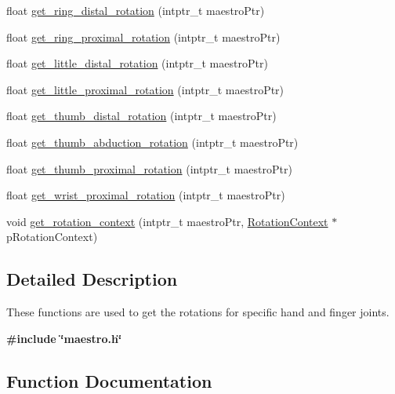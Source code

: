 \begin{DoxyCompactItemize}
float \hyperlink{group__rotation_access_ga684f53b38b169aaab88de85578387a38}{get\+\_\+ring\+\_\+distal\+\_\+rotation} (intptr\+\_\+t maestro\+Ptr)
\item 
float \hyperlink{group__rotation_access_ga2941894deaa99df80b74f33c824bbb07}{get\+\_\+ring\+\_\+proximal\+\_\+rotation} (intptr\+\_\+t maestro\+Ptr)
\item 
float \hyperlink{group__rotation_access_ga4e5835f8eae4b89728219b50ff20259b}{get\+\_\+little\+\_\+distal\+\_\+rotation} (intptr\+\_\+t maestro\+Ptr)
\item 
float \hyperlink{group__rotation_access_ga92c96531688ae5be50890e7883eccd05}{get\+\_\+little\+\_\+proximal\+\_\+rotation} (intptr\+\_\+t maestro\+Ptr)
\item 
float \hyperlink{group__rotation_access_ga47f787dada77cf7f4f39ebf245aec420}{get\+\_\+thumb\+\_\+distal\+\_\+rotation} (intptr\+\_\+t maestro\+Ptr)
\item 
float \hyperlink{group__rotation_access_ga2dddb1473cdf463238904595e309938f}{get\+\_\+thumb\+\_\+abduction\+\_\+rotation} (intptr\+\_\+t maestro\+Ptr)
\item 
float \hyperlink{group__rotation_access_gafc4acff90b0a11899e18ab2212ec6ce2}{get\+\_\+thumb\+\_\+proximal\+\_\+rotation} (intptr\+\_\+t maestro\+Ptr)
\item 
float \hyperlink{group__rotation_access_ga155f18439d7b43c1722b035fc38a3225}{get\+\_\+wrist\+\_\+proximal\+\_\+rotation} (intptr\+\_\+t maestro\+Ptr)
\item 
void \hyperlink{group__rotation_access_gaebc91ec820b72decfafe94a3fa34974d}{get\+\_\+rotation\+\_\+context} (intptr\+\_\+t maestro\+Ptr, \hyperlink{struct_rotation_context}{Rotation\+Context} $\ast$p\+Rotation\+Context)
\end{DoxyCompactItemize}


\subsection{Detailed Description}
These functions are used to get the rotations for specific hand and finger joints. 

{\bfseries {\ttfamily \#include \char`\"{}maestro.\+h\char`\"{}}} 

\subsection{Function Documentation}
\mbox{\label{group__rotation_access_ga00e2691df05ed045e6f2ec02082d941c}} 
